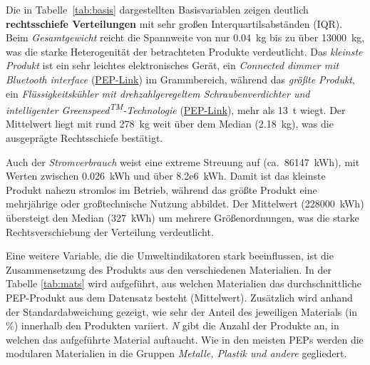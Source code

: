 \noindent
Die in Tabelle~\ref{tab:basis} dargestellten Basisvariablen zeigen deutlich \textbf{rechtsschiefe Verteilungen} mit sehr großen Interquartilsabständen (IQR).
Beim \emph{Gesamtgewicht} reicht die Spannweite von nur 0.04~kg bis zu über 13000~kg, was die starke Heterogenität der betrachteten Produkte verdeutlicht.
Das \emph{kleinste Produkt} ist ein sehr leichtes elektronisches Gerät, ein \emph{Connected dimmer mit Bluetooth interface}
(\href{https://register.pep-ecopassport.org/pep/consult/mbesqrsCBZbWbKJq6-kJ3gQki33tF6v8mGqIbNl9ZBA/mbesqrsCBZbWbKJq6-kJ3lQmBuGvAHsLUfQU9idjOpk}{PEP-Link}) im Grammbereich,
während das \emph{größte Produkt}, ein \emph{Flüssigkeits\-kühler mit drehzahlgeregeltem Schrauben\-verdichter und intelligenter Greenspeed\textsuperscript{TM}\mbox{}-Technologie}
(\href{https://register.pep-ecopassport.org/pep/consult/mbesqrsCBZbWbKJq6-kJ3i_N0-YkMDn5wDN9lr3hiPE/mbesqrsCBZbWbKJq6-kJ3lQmBuGvAHsLUfQU9idjOpk}{PEP-Link}),
mehr als 13~t wiegt.
Der Mittelwert liegt mit rund 278~kg weit über dem Median (2.18~kg), was die ausgeprägte Rechtsschiefe bestätigt.

Auch der \emph{Stromverbrauch} weist eine extreme Streuung auf (ca.~86147~kWh), mit Werten zwischen 0.026~kWh und über 8.2e6~kWh.
Damit ist das kleinste Produkt nahezu stromlos im Betrieb, während das größte Produkt eine mehrjährige oder großtechnische Nutzung abbildet.
Der Mittelwert (228000~kWh) übersteigt den Median (327~kWh) um mehrere Größenordnungen, was die starke Rechtsverschiebung der Verteilung verdeutlicht.


Eine weitere Variable, die die Umweltindikatoren stark beeinflussen, ist die Zusammensetzung des Produkts aus den verschiedenen Materialien.
In der Tabelle \ref{tab:mats} wird aufgeführt, aus welchen Materialien das durchschnittliche PEP-Produkt aus dem Datensatz besteht (Mittelwert).
Zusätzlich wird anhand der Standardabweichung gezeigt, wie sehr der Anteil des jeweiligen Materials (in \%) innerhalb den Produkten variiert.
\emph{N} gibt die Anzahl der Produkte an, in welchen das aufgeführte Material auftaucht. Wie in den meisten PEPs werden die modularen Materialien in
die Gruppen \emph{Metalle, Plastik und andere} gegliedert. 

